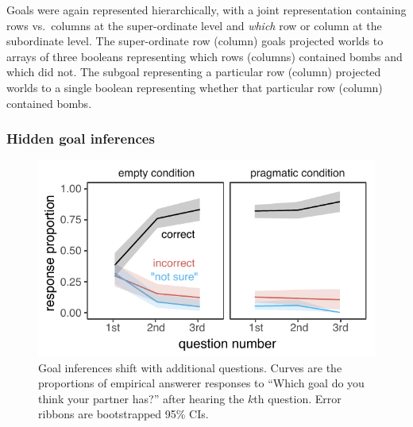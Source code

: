 \documentclass[11pt, floatsintext]{apa6}
\begin{document}
Goals were again represented hierarchically, with a joint representation containing rows vs.~columns at the super-ordinate level and \emph{which} row or column at the subordinate level.
The super-ordinate row (column) goals projected worlds to arrays of three booleans representing which rows (columns) contained bombs and which did not.
The subgoal representing a particular row (column) projected worlds to a single boolean representing whether that particular row (column) contained bombs.

\subsubsection{Hidden goal inferences}


\begin{figure}[t!]
\begin{center}
\includegraphics[scale = .8]{Exp3/spatialGoalInference_final.pdf}
\end{center}
\caption{Goal inferences shift with additional questions. Curves are the proportions of empirical answerer responses to ``Which goal do you think your partner has?''  after hearing the $k$th question. Error ribbons are bootstrapped 95\% CIs.}
\label{fig:exp3goalinference}
\end{figure}
\end{document}
